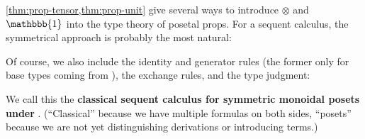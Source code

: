 \documentclass{book}
\let\types\vdash
\def\type{\;\ftype}
\def\unit{\mathbbb{1}}%
\def\one{\mathbf{1}}
\let\tensor\otimes
\def\tensorL{\mathord{\tensor}L}
\def\tensorR{\mathord{\tensor}R}
\begin{document}
\cref{thm:prop-tensor,thm:prop-unit} give several ways to introduce $\tensor$ and $\unit$ into the type theory of posetal props.
For a sequent calculus, the symmetrical approach is probably the most natural:
Of course, we also include the identity and generator rules (the former only for base types coming from \cG), the exchange rules, and the type judgment:
We call this the \textbf{classical sequent calculus for symmetric monoidal posets under \cG}.
(``Classical'' because we have multiple formulas on both sides, ``posets'' because we are not yet distinguishing derivations or introducing terms.)
\end{document}
